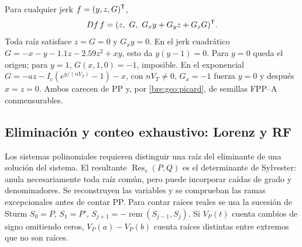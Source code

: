 Para cualquier jerk $f=(y,z,G)^{\mathsf T}$,
\begin{equation}
 Df\,f=(z,\ G,\ G_xy+G_yz+G_zG)^{\mathsf T}.
 \label{bre:geo:jerk}
\end{equation}
Toda raíz satisface $z=G=0$ y $G_xy=0$. En el jerk cuadrático
$G=-x-y-1.1z-2.59z^2+xy$, esto da $y(y-1)=0$. Para $y=0$ queda
el origen; para $y=1$, $G(x,1,0)=-1$, imposible. En el exponencial
$G=-az-I_c(e^{y/(nV_T)}-1)-x$, con $nV_T\ne0$, $G_x=-1$ fuerza
$y=0$ y después $x=z=0$. Ambos carecen de PP y, por
\eqref{bre:geo:picard}, de semillas FPP--A conmensurables.

\subsection{Eliminación y conteo exhaustivo: Lorenz y RF}

Los sistemas polinomiales requieren distinguir una raíz del eliminante de
una solución del sistema. El resultante $\operatorname{Res}_v(P,Q)$ es
el determinante de Sylvester: anula necesariamente toda raíz común, pero
puede incorporar caídas de grado y denominadores. Se reconstruyen las
variables y se comprueban las ramas excepcionales antes de contar PP.
Para contar raíces reales se usa la sucesión de Sturm
$S_0=P$, $S_1=P'$, $S_{j+1}=-\operatorname{rem}(S_{j-1},S_j)$.
Si $V_P(t)$ cuenta cambios de signo omitiendo ceros,
$V_P(a)-V_P(b)$ cuenta raíces distintas entre extremos que no son raíces.

